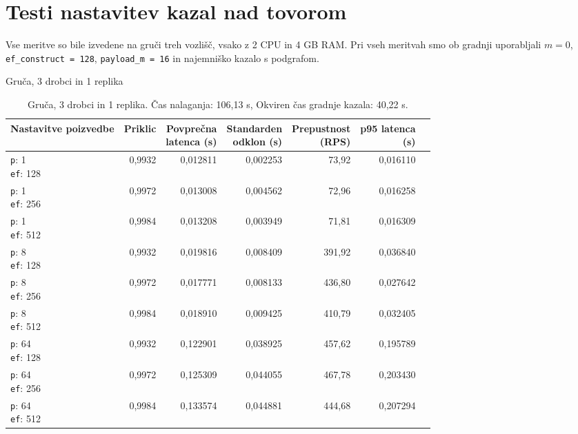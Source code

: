 \clearpage

\section{Testi nastavitev kazal nad tovorom}

Vse meritve so bile izvedene na gruči treh vozlišč, vsako z 2 CPU in 4 GB RAM. Pri vseh meritvah smo ob gradnji uporabljali $m = 0$, \texttt{ef\_construct = 128}, \texttt{payload\_m = 16} in najemniško kazalo s podgrafom.

\begin{table}[htbp]
  \centering
\small
  \caption{Gruča, 3 drobci in 1 replika}
  \label{tab:cluster-2cpu-4ram:tenant:s3-r1:qdrant-dipl-sharding-3-shards-1-replica-tenant-m-16-ef-128-random-768-100-tenants-extended-upload-2026-08-17-15-58-42.json}
  \begin{tabularx}{\textwidth}{Xrrrrrr}
    \toprule
    Nastavitve poizvedbe & Priklic & \makecell{Povprečna\\latenca (s)} & \makecell{Standarden\\odklon (s)} & \makecell{Prepustnost\\(RPS)} & \makecell{p95 latenca\\(s)}  \\
    \midrule
    \makecell{\texttt{p}: 1\\\texttt{ef}: 128} & 0,9932 & 0,012811 & 0,002253 & 73,92 & 0,016110 \\
    \makecell{\texttt{p}: 1\\\texttt{ef}: 256} & 0,9972 & 0,013008 & 0,004562 & 72,96 & 0,016258 \\
    \makecell{\texttt{p}: 1\\\texttt{ef}: 512} & 0,9984 & 0,013208 & 0,003949 & 71,81 & 0,016309 \\
    \makecell{\texttt{p}: 8\\\texttt{ef}: 128} & 0,9932 & 0,019816 & 0,008409 & 391,92 & 0,036840 \\
    \makecell{\texttt{p}: 8\\\texttt{ef}: 256} & 0,9972 & 0,017771 & 0,008133 & 436,80 & 0,027642 \\
    \makecell{\texttt{p}: 8\\\texttt{ef}: 512} & 0,9984 & 0,018910 & 0,009425 & 410,79 & 0,032405 \\
    \makecell{\texttt{p}: 64\\\texttt{ef}: 128} & 0,9932 & 0,122901 & 0,038925 & 457,62 & 0,195789 \\
    \makecell{\texttt{p}: 64\\\texttt{ef}: 256} & 0,9972 & 0,125309 & 0,044055 & 467,78 & 0,203430 \\
    \makecell{\texttt{p}: 64\\\texttt{ef}: 512} & 0,9984 & 0,133574 & 0,044881 & 444,68 & 0,207294 \\
    \bottomrule
  \end{tabularx}
\caption* {Gruča, 3 drobci in 1 replika. Čas nalaganja: 106,13 s, Okviren čas gradnje kazala: 40,22 s.}\end{table}

